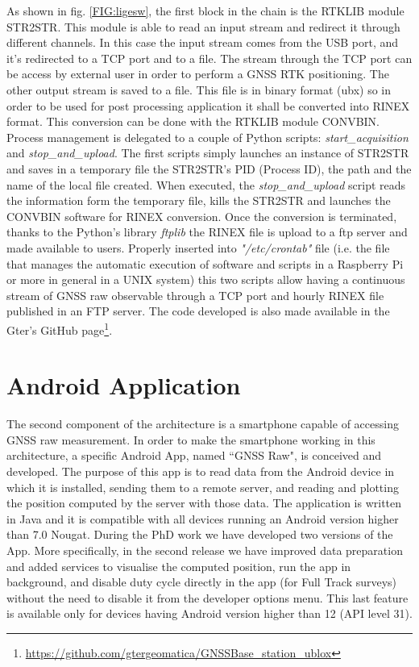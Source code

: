 As shown in fig. \ref{FIG:ligesw}, the first block in the chain is the RTKLIB module STR2STR. This module is able to read an input stream and redirect it through different channels. In this case the input stream comes from the USB port, and it's redirected to a TCP port and to a file. The stream through the TCP port can be access by external user in order to perform a GNSS RTK positioning. The other output stream is saved to a file. This file is in binary format (ubx) so in order to be used for post processing application it shall be converted into RINEX format. This conversion can be done with the RTKLIB module CONVBIN. 
Process management is delegated to a couple of Python scripts: \textit{start\_acquisition} and \textit{stop\_and\_upload}. The first scripts simply launches an instance of STR2STR and saves in a temporary file the STR2STR's PID (Process ID), the path and the name of the local file created. When executed, the  \textit{stop\_and\_upload} script reads the information form the temporary file, kills the STR2STR and launches the CONVBIN software for RINEX conversion. Once the conversion is terminated, thanks to the Python's library \textit{ftplib} the RINEX file is upload to a ftp server and made available to users.
Properly inserted into \textit{"/etc/crontab"} file (i.e. the file that manages the automatic execution of software and scripts in a Raspberry Pi or more in general in a UNIX system) this two scripts allow having a continuous stream of GNSS raw observable through a TCP port and hourly RINEX file published in an FTP server. 
The code developed is also made available in the Gter's GitHub page\footnote{\url{https://github.com/gtergeomatica/GNSSBase_station_ublox}}.

\section{Android Application}
\label{sec:gnssraw}
%
The second component of the architecture  is a smartphone capable of accessing GNSS raw measurement. In order to make the smartphone working in this architecture, a specific Android App, named  ``GNSS Raw", is conceived and developed. The purpose of this app is to read data from the Android device in which it is installed, sending them to a remote server, and reading and plotting the position computed by the server with those data.
The application is written in Java and it is compatible with all devices running an Android version higher than 7.0 Nougat. During the PhD work we have developed two versions of the App. More specifically, in the second release we have improved data preparation and added services to visualise the computed position, run the app in background, and disable duty cycle directly in the app (for Full Track surveys) without the need to disable it from the developer options menu. This last feature is available only for devices having Android version higher than 12 (API level 31).

